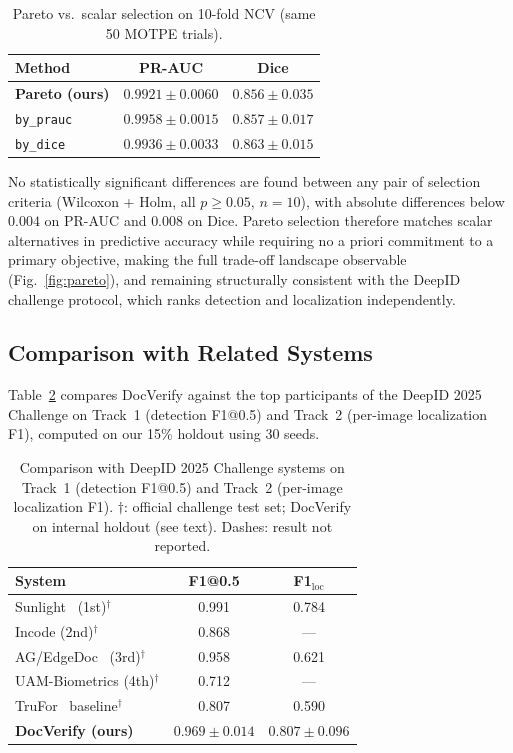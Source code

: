 \begin{table}[!t]
  \centering
  \caption{Pareto vs.\ scalar selection on 10-fold NCV (same 50 MOTPE trials).}
  \label{tab:scalar}
  \begin{tabular}{lcc}
    \toprule
    Method & PR-AUC & Dice \\
    \midrule
    \textbf{Pareto (ours)} & $0.9921 \pm 0.0060$ & $0.856 \pm 0.035$ \\
    \texttt{by\_prauc}     & $0.9958 \pm 0.0015$ & $0.857 \pm 0.017$ \\
    \texttt{by\_dice}      & $0.9936 \pm 0.0033$ & $0.863 \pm 0.015$ \\
    \bottomrule
  \end{tabular}
\end{table}

No statistically significant differences are found between any pair of
selection criteria (Wilcoxon + Holm, all $p \geq 0.05$, $n = 10$), with
absolute differences below $0.004$ on PR-AUC and $0.008$ on Dice.
Pareto selection therefore matches scalar alternatives in predictive
accuracy while requiring no a priori commitment to a primary objective,
making the full trade-off landscape observable (Fig.~\ref{fig:pareto}),
and remaining structurally consistent with the DeepID challenge protocol,
which ranks detection and localization independently.

\subsection{Comparison with Related Systems}
\label{subsec:challenge}

Table~\ref{tab:challenge} compares DocVerify against the top participants of
the DeepID 2025 Challenge on Track~1 (detection F1@0.5) and Track~2
(per-image localization F1), computed on our 15\% holdout using 30 seeds.

\begin{table}[!t]
  \centering
  \small
  \caption{Comparison with DeepID 2025 Challenge systems on Track~1
    (detection F1@0.5) and Track~2 (per-image localization F1).
    $\dagger$: official challenge test set;
    DocVerify on internal holdout (see text).
    Dashes: result not reported.}
  \label{tab:challenge}
  \begin{tabular}{p{3.6cm}cc}
    \toprule
    System & F1@0.5 & F1$_{\text{loc}}$ \\
    \midrule
    Sunlight~\citep{remtkd2025} (1st)$^\dagger$    & 0.991 & 0.784 \\
    Incode (2nd)$^\dagger$                          & 0.868 & —     \\
    AG/EdgeDoc~\citep{edgedoc2025} (3rd)$^\dagger$ & 0.958 & 0.621 \\
    UAM-Biometrics (4th)$^\dagger$                  & 0.712 & —     \\
    TruFor~\citep{trufor2023} baseline$^\dagger$   & 0.807 & 0.590 \\
    \midrule
    \textbf{DocVerify (ours)} & $\mathbf{0.969 \pm 0.014}$ & $\mathbf{0.807 \pm 0.096}$ \\
    \bottomrule
  \end{tabular}
\end{table}

